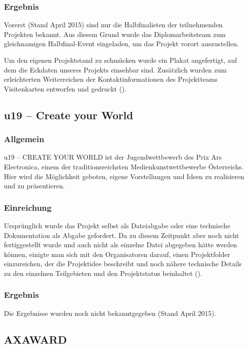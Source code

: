 \subsubsection{Ergebnis}
Vorerst (Stand April 2015) sind nur die Halbfinalisten der teilnehmenden Projekten bekannt.
Aus diesem Grund wurde das Diplomarbeitsteam
zum gleichnamigen Halbfinal-Event eingeladen, um das Projekt vorort auszustellen.

Um den eigenen Projektstand zu schmücken wurde ein Plakat angefertigt, auf dem die Eckdaten unseres
Projekts einsehbar sind.
Zusätzlich wurden zum erleichterten Weiterreichen der Kontaktinformationen des Projektteams Visitenkarten
entworfen und gedruckt ().

\subsection{u19 -- Create your World}
\subsubsection{Allgemein}
u19 – CREATE YOUR WORLD ist der Jugendwettbewerb des Prix Ars Electronica, einem der traditionsreichsten Medienkunstwettbewerbe Österreichs.
Hier wird die Möglichkeit geboten, eigene Vorstellungen und Ideen zu realisieren und zu präsentieren.

\subsubsection{Einreichung}
Ursprünglich wurde das Projekt selbst als Dateiabgabe oder eine technische Dokumentation als Abgabe gefordert. Da \sblit zu diesem Zeitpunkt
aber noch nicht fertiggestellt wurde und auch nicht als einzelne Datei abgegeben hätte werden können,
einigte man sich mit den Organisatoren darauf, einen Projektfolder einzureichen, der die Projektidee
beschreibt und noch nähere technische Details zu den einzelnen Teilgebieten und den Projektstatus beinhaltet ().


\subsubsection{Ergebnis}
Die Ergebnisse wurden noch nicht bekanntgegeben (Stand April 2015).

\subsection{AXAWARD}

